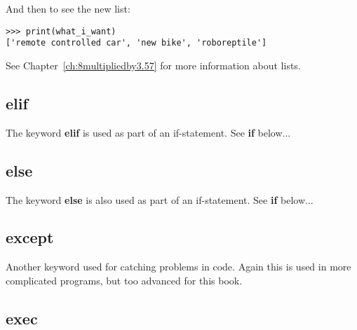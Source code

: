 \noindent
And then to see the new list:

\begin{Verbatim}[frame=single]
>>> print(what_i_want)
['remote controlled car', 'new bike', 'roboreptile']
\end{Verbatim}

\noindent
See Chapter~\ref{ch:8multipliedby3.57} for more information about lists.

\subsection*{elif}

The keyword \textbf{elif} is used as part of an if-statement.  See \textbf{if} below...

\subsection*{else}

The keyword \textbf{else} is also used as part of an if-statement.  See \textbf{if} below...

\subsection*{except}

Another keyword used for catching problems in code. Again this is used in more complicated programs, but too advanced for this book.

\subsection*{exec}

